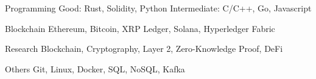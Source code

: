 


\begin{cvskills}


\cvskill
{Programming} %
{Good: Rust, Solidity, Python Intermediate: C/C++, Go, Javascript } %


\cvskill
{Blockchain} %
{Ethereum, Bitcoin, XRP Ledger, Solana, Hyperledger Fabric} %


\cvskill
{Research} %
{Blockchain, Cryptography, Layer 2, Zero-Knowledge Proof, DeFi} %


\cvskill
{Others} %
{Git, Linux, Docker, SQL, NoSQL, Kafka} %


\end{cvskills}
